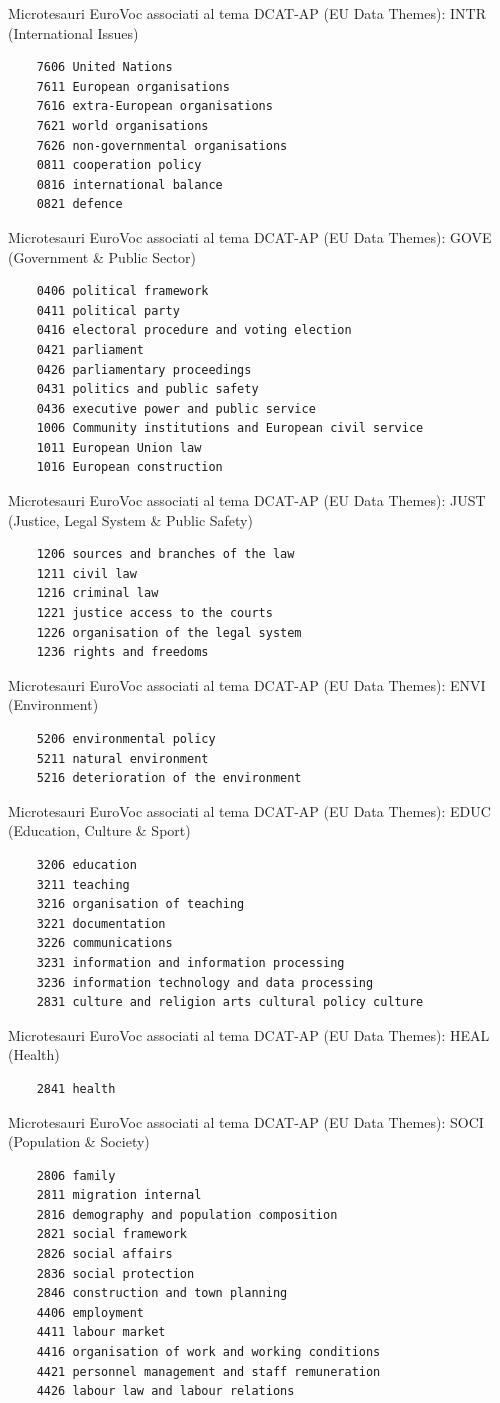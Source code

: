 \documentclass{article}
\theoremstyle{plain}
\theoremstyle{definition}
\begin{document}
Microtesauri EuroVoc associati al tema DCAT-AP (EU Data Themes): INTR (International Issues) 
\begin{verbatim}
    7606 United Nations
    7611 European organisations 
    7616 extra-European organisations 
    7621 world organisations
    7626 non-governmental organisations
    0811 cooperation policy
    0816 international balance 
    0821 defence 
\end{verbatim}
Microtesauri EuroVoc associati al tema DCAT-AP (EU Data Themes): GOVE (Government \& Public Sector) 
\begin{verbatim}
    0406 political framework
    0411 political party 
    0416 electoral procedure and voting election
    0421 parliament 
    0426 parliamentary proceedings
    0431 politics and public safety 
    0436 executive power and public service 
    1006 Community institutions and European civil service 
    1011 European Union law 
    1016 European construction
\end{verbatim}
Microtesauri EuroVoc associati al tema DCAT-AP (EU Data Themes): JUST (Justice, Legal System \& Public Safety) 
\begin{verbatim}
    1206 sources and branches of the law 
    1211 civil law 
    1216 criminal law 
    1221 justice access to the courts 
    1226 organisation of the legal system 
    1236 rights and freedoms
\end{verbatim}
Microtesauri EuroVoc associati al tema DCAT-AP (EU Data Themes): ENVI (Environment) 
\begin{verbatim}
    5206 environmental policy
    5211 natural environment
    5216 deterioration of the environment 
\end{verbatim}
Microtesauri EuroVoc associati al tema DCAT-AP (EU Data Themes): EDUC (Education, Culture \& Sport) 
\begin{verbatim}
    3206 education
    3211 teaching 
    3216 organisation of teaching 
    3221 documentation 
    3226 communications
    3231 information and information processing
    3236 information technology and data processing 
    2831 culture and religion arts cultural policy culture
\end{verbatim}
Microtesauri EuroVoc associati al tema DCAT-AP (EU Data Themes): HEAL (Health) 
\begin{verbatim}
    2841 health
\end{verbatim}
Microtesauri EuroVoc associati al tema DCAT-AP (EU Data Themes): SOCI (Population \& Society) 
\begin{verbatim}
    2806 family 
    2811 migration internal 
    2816 demography and population composition 
    2821 social framework
    2826 social affairs
    2836 social protection
    2846 construction and town planning 
    4406 employment
    4411 labour market 
    4416 organisation of work and working conditions 
    4421 personnel management and staff remuneration
    4426 labour law and labour relations
\end{verbatim}
\end{document}
